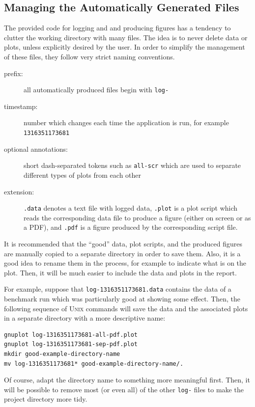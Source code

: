 \documentclass[a4paper,10pt]{article}
\begin{document}
\subsection{Managing the Automatically Generated Files}

The provided code for logging and and producing figures has a tendency to clutter the working directory with many files.
The idea is to never delete data or plots, unless explicitly desired by the user.
In order to simplify the management of these files, they follow very strict naming conventions.

\begin{description}
\item[prefix:]
  all automatically produced files begin with \texttt{log-}
\item[timestamp:]
  number which changes each time the application is run, for example \texttt{1316351173681}
\item[optional annotations:]
  short dash-separated tokens such as \texttt{all-scr} which are used to separate different types of plots from each other
\item[extension:]
  \texttt{.data} denotes a text file with logged data, \texttt{.plot} is a plot script which reads the corresponding data file to produce a figure (either on screen or as a PDF), and \texttt{.pdf} is a figure produced by the corresponding script file.
\end{description}

It is recommended that the ``good'' data, plot scripts, and the produced figures are manually copied to a separate directory in order to save them.
Also, it is a good idea to rename them in the process, for example to indicate what is on the plot.
Then, it will be much easier to include the data and plots in the report.

For example, suppose that \texttt{log-1316351173681.data} contains the data of a benchmark run which was particularly good at showing some effect.
Then, the following sequence of \textsc{Unix} commands will save the data and the associated plots in a separate directory with a more descriptive name:

\begin{verbatim}
gnuplot log-1316351173681-all-pdf.plot
gnuplot log-1316351173681-sep-pdf.plot
mkdir good-example-directory-name
mv log-1316351173681* good-example-directory-name/.
\end{verbatim}

Of course, adapt the directory name to something more meaningful first.
Then, it will be possible to remove most (or even all) of the other \texttt{log-} files to make the project directory more tidy.
\end{document}
